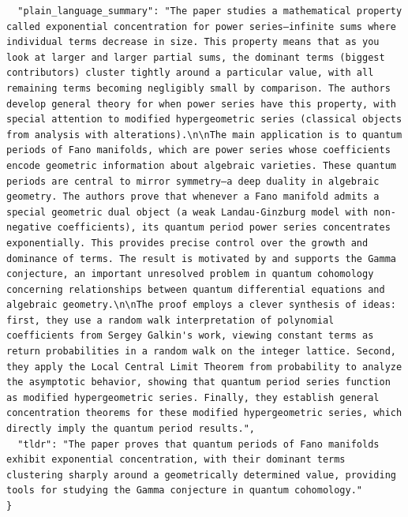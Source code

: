 \documentclass[11pt]{article}
\begin{document}
\begin{verbatim}
  "plain_language_summary": "The paper studies a mathematical property called exponential concentration for power series—infinite sums where individual terms decrease in size. This property means that as you look at larger and larger partial sums, the dominant terms (biggest contributors) cluster tightly around a particular value, with all remaining terms becoming negligibly small by comparison. The authors develop general theory for when power series have this property, with special attention to modified hypergeometric series (classical objects from analysis with alterations).\n\nThe main application is to quantum periods of Fano manifolds, which are power series whose coefficients encode geometric information about algebraic varieties. These quantum periods are central to mirror symmetry—a deep duality in algebraic geometry. The authors prove that whenever a Fano manifold admits a special geometric dual object (a weak Landau-Ginzburg model with non-negative coefficients), its quantum period power series concentrates exponentially. This provides precise control over the growth and dominance of terms. The result is motivated by and supports the Gamma conjecture, an important unresolved problem in quantum cohomology concerning relationships between quantum differential equations and algebraic geometry.\n\nThe proof employs a clever synthesis of ideas: first, they use a random walk interpretation of polynomial coefficients from Sergey Galkin's work, viewing constant terms as return probabilities in a random walk on the integer lattice. Second, they apply the Local Central Limit Theorem from probability to analyze the asymptotic behavior, showing that quantum period series function as modified hypergeometric series. Finally, they establish general concentration theorems for these modified hypergeometric series, which directly imply the quantum period results.",
  "tldr": "The paper proves that quantum periods of Fano manifolds exhibit exponential concentration, with their dominant terms clustering sharply around a geometrically determined value, providing tools for studying the Gamma conjecture in quantum cohomology."
}
\end{verbatim}
\end{document}
